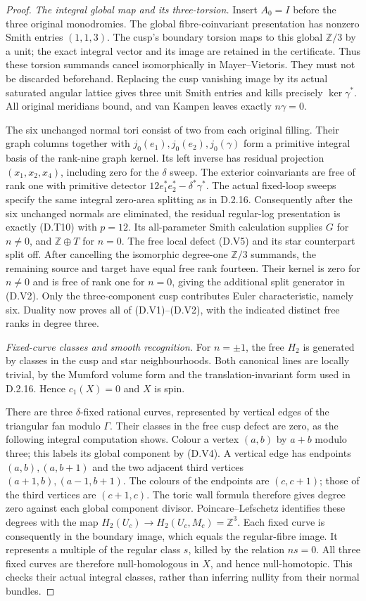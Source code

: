 \begin{proof}
\emph{The integral global map and its three-torsion.}
Insert $A_0=I$ before the three original monodromies.
The global fibre-coinvariant presentation has nonzero
Smith entries $(1,1,3)$. The cusp's boundary torsion maps
to this global $\mathbb Z/3$ by a unit; the exact integral
vector and its image are retained in the certificate.
Thus these torsion summands cancel isomorphically in
Mayer--Vietoris. They must not be discarded beforehand.
Replacing the cusp vanishing image by its actual saturated
angular lattice gives three unit Smith entries and kills
precisely $\ker\gamma^*$. All original meridians bound,
and van Kampen leaves exactly $n\gamma=0$.

The six unchanged normal tori consist of two from each
original filling. Their graph columns together with
$j_0(e_1),j_0(e_2),j_0(\gamma)$ form a primitive integral
basis of the rank-nine graph kernel. Its left inverse
has residual projection $(x_1,x_2,x_4)$, including zero
for the $\delta$ sweep. The exterior coinvariants are
free of rank one with primitive detector
$12e_1^*e_2^*-\delta^*\gamma^*$.
The actual fixed-loop sweeps specify the same integral
zero-area splitting as in D.2.16. Consequently after the
six unchanged normals are eliminated, the residual
regular-log presentation is exactly (D.T10) with $p=12$.
Its all-parameter Smith calculation supplies $G$ for
$n\ne0$, and $\mathbb Z\oplus T$ for $n=0$.
The free local defect (D.V5) and its star counterpart
split off. After cancelling the isomorphic degree-one
$\mathbb Z/3$ summands, the remaining source and target
have equal free rank fourteen. Their kernel is zero for
$n\ne0$ and is free of rank one for $n=0$, giving the
additional split generator in (D.V2).
Only the three-component cusp contributes Euler
characteristic, namely six. Duality now proves all of
(D.V1)--(D.V2), with the indicated distinct free ranks
in degree three.

\emph{Fixed-curve classes and smooth recognition.}
For $n=\pm1$, the free $H_2$ is generated by classes in
the cusp and star neighbourhoods. Both canonical lines
are locally trivial, by the Mumford volume form and
the translation-invariant form used in D.2.16.
Hence $c_1(X)=0$ and $X$ is spin.

There are three $\delta$-fixed rational curves, represented
by vertical edges of the triangular fan modulo $\Gamma$.
Their classes in the free cusp defect are zero, as the
following integral computation shows. Colour a vertex
$(a,b)$ by $a+b$ modulo three; this labels its global
component by (D.V4). A vertical edge has endpoints
$(a,b),(a,b+1)$ and the two adjacent third vertices
$(a+1,b),(a-1,b+1)$. The colours of the endpoints are
$(c,c+1)$; those of the third vertices are $(c+1,c)$.
The toric wall formula therefore gives degree zero
against each global component divisor. Poincare--Lefschetz
identifies these degrees with the map
$H_2(U_c)\to H_2(U_c,M_c)=\mathbb Z^3$.
Each fixed curve is consequently in the boundary image,
which equals the regular-fibre image. It represents a
multiple of the regular class $s$, killed by the relation
$ns=0$. All three fixed curves are therefore null-homologous
in $X$, and hence null-homotopic. This checks their actual
integral classes, rather than inferring nullity from their
normal bundles.


\end{proof}

